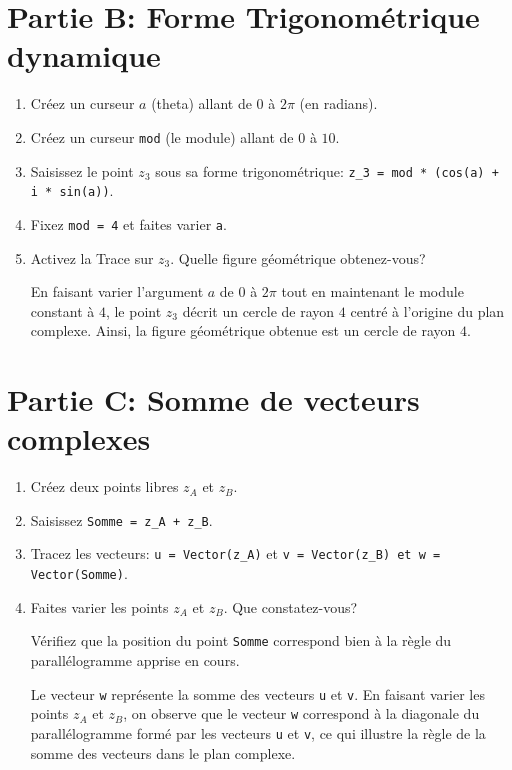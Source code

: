 \documentclass[11pt, a4paper]{report}
\begin{document}
\section*{Partie B\@: Forme Trigonométrique dynamique}


\begin{enumerate}[resume]
    \item Créez un curseur $a$ (theta) allant de $0$ à $2\pi$ (en radians).
    \item Créez un curseur \texttt{mod} (le module) allant de $0$ à $10$.
    \item Saisissez le point $z_3$ sous sa forme trigonométrique: \verb|z_3 = mod * (cos(a) + i * sin(a))|.
    \item  Fixez \texttt{mod = 4} et faites varier \verb|a|. 
    \item Activez la \og{}Trace\fg{} sur $z_3$. Quelle figure géométrique obtenez-vous?
\begin{blocvisible}[height=2]
    En faisant varier l'argument $a$ de $0$ à $2\pi$ tout en maintenant le module constant à $4$, le point $z_3$ décrit un cercle de rayon $4$ centré à l'origine du plan complexe. Ainsi, la figure géométrique obtenue est un cercle de rayon $4$.

\end{blocvisible}     
\end{enumerate}

\section*{Partie C\@: Somme de vecteurs complexes}

\begin{enumerate}[resume]
    \item Créez deux points libres $z_A$ et $z_B$.
    \item Saisissez \verb|Somme = z_A + z_B|.
    \item Tracez les vecteurs: \verb|u = Vector(z_A)| et \verb|v = Vector(z_B) et w = Vector(Somme)|.
    \item Faites varier les points $z_A$ et $z_B$. Que constatez-vous?

    Vérifiez que la position du point \verb|Somme| correspond bien à la règle du parallélogramme apprise en cours.
    \begin{blocvisible}[height=2]
    Le vecteur \verb|w| représente la somme des vecteurs \verb|u| et \verb|v|. En faisant varier les points $z_A$ et $z_B$, on observe que le vecteur \texttt{w} correspond à la diagonale du parallélogramme formé par les vecteurs \texttt{u} et \texttt{v}, ce qui illustre la règle de la somme des vecteurs dans le plan complexe.
\end{blocvisible}
\end{enumerate}
    
\end{document}

